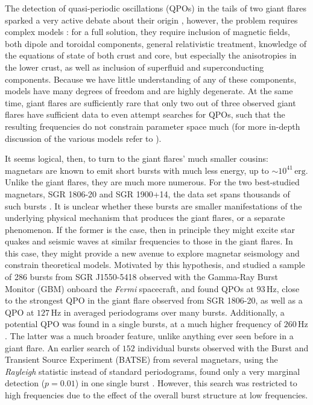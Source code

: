 \documentclass[numberedappendix]{emulateapj}
\newcommand{\hz}{\,\mathrm{Hz}}
\begin{document}
The detection of quasi-periodic oscillations (QPOs) in the tails of two giant flares sparked a very active debate about their origin \citep{israel2005,strohmayer2005,strohmayer2006,watts2006}, however, the problem requires complex models \citep[for a general discussion, see ][]{watts2011}: for a full solution, they require inclusion of magnetic fields, both dipole and toroidal components, general relativistic treatment, knowledge of the equations of state of both crust and core, but especially the anisotropies in the lower crust, as well as inclusion of superfluid and superconducting components. Because we have little understanding of any of these components, models have many degrees of freedom and are highly degenerate. At the same time, giant flares are sufficiently rare that only two out of three observed giant flares have sufficient data to even attempt searches for QPOs, such that the resulting frequencies do not constrain parameter space much (for more in-depth discussion of the various models refer to \citealp{samuelsson2007,andersson2009,sotani2007,sotani2008,vanhoven2008,vanhoven2011,vanhoven2012,colaiuda2011,colaiuda2012,gabler2011,gabler2012,gabler2013,passamonti2013a,passamonti2013b,lander2010,lander2011,glampedakis2006,glampedakis2014}).

It seems logical, then, to turn to the giant flares' much smaller cousins: magnetars are known to emit short bursts with much less energy, up to $\sim 10^{41} \, \mathrm{erg}$. Unlike the giant flares, they are much more numerous. For the two best-studied magnetars, SGR 1806-20 and SGR 1900+14, the data set spans thousands of such bursts \citep[e.g.][]{gogus1999,gogus2000,prieskorn2012}. It is unclear whether these bursts are smaller manifestations of the underlying physical mechanism that produces the giant flares, or a separate phenomenon. If the former is the case, then in principle they might excite star quakes and seismic waves at similar frequencies to those in the giant flares. In this case, they might provide a new avenue to explore magnetar seismology and constrain theoretical models. Motivated by this hypothesis, \citet{huppenkothen2013} and \citet{huppenkothen2014} studied a sample of 286 bursts from SGR J1550-5418 observed with the Gamma-Ray Burst Monitor (GBM) onboard the {\it Fermi} spacecraft, and found QPOs at $93 \hz$, close to the strongest QPO in the giant flare observed from SGR 1806-20, as well as a QPO at $127\hz$ in averaged periodograms over many bursts. Additionally, a potential QPO was found in a single bursts, at a much higher frequency of $260 \hz$. The latter was a much broader feature, unlike anything ever seen before in a giant flare.
An earlier search of $152$ individual bursts observed with the Burst and Transient Source Experiment (BATSE) from several magnetars, using the {\it Rayleigh} statistic instead of standard periodograms, found only a very marginal detection ($p = 0.01$) in one single burst \cite{kruger2002}. However, this search was restricted to high frequencies due to the effect of the overall burst structure at low frequencies.
\end{document}
